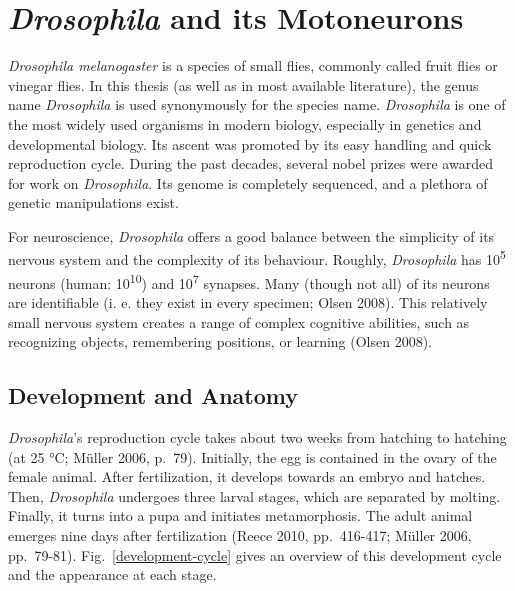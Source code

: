 \documentclass[12pt,a4paper,]{report}
\begin{document}
\section{\emph{Drosophila} and its
Motoneurons}\label{drosophila-and-its-motoneurons}

\emph{Drosophila melanogaster} is a species of small flies, commonly
called fruit flies or vinegar flies. In this thesis (as well as in most
available literature), the genus name \emph{Drosophila} is used
synonymously for the species name. \emph{Drosophila} is one of the most
widely used organisms in modern biology, especially in genetics and
developmental biology. Its ascent was promoted by its easy handling and
quick reproduction cycle. During the past decades, several nobel prizes
were awarded for work on \emph{Drosophila}. Its genome is completely
sequenced, and a plethora of genetic manipulations exist.

For neuroscience, \emph{Drosophila} offers a good balance between the
simplicity of its nervous system and the complexity of its behaviour.
Roughly, \emph{Drosophila} has 10\textsuperscript{5} neurons (human:
10\textsuperscript{10}) and 10\textsuperscript{7} synapses. Many (though
not all) of its neurons are identifiable (i. e. they exist in every
specimen; Olsen 2008). This relatively small nervous system creates a
range of complex cognitive abilities, such as recognizing objects,
remembering positions, or learning (Olsen 2008).

\subsection{Development and Anatomy}\label{development-and-anatomy}

\emph{Drosophila}'s reproduction cycle takes about two weeks from
hatching to hatching (at 25 °C; Müller 2006, p.~79). Initially, the egg
is contained in the ovary of the female animal. After fertilization, it
develops towards an embryo and hatches. Then, \emph{Drosophila}
undergoes three larval stages, which are separated by molting. Finally,
it turns into a pupa and initiates metamorphosis. The adult animal
emerges nine days after fertilization (Reece 2010, pp.~416-417; Müller
2006, pp.~79-81). Fig.~\ref{development-cycle} gives an overview of this
development cycle and the appearance at each stage.
\end{document}
